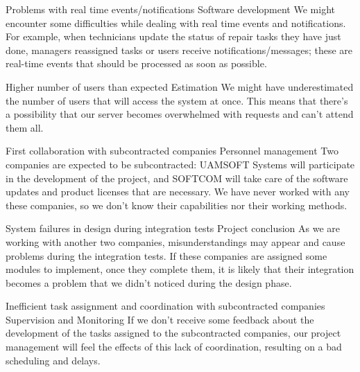\begin{risk}{Problems with real time events/notifications}
\label{riskRealTime}
\riskcat Software development
\riskdesc We might encounter some difficulties while dealing with real time events and notifications. For example, when technicians update the status of repair tasks they have just done, managers reassigned tasks or users receive notifications/messages; these are real-time events that should be processed as soon as possible.
\end{risk}

\begin{risk}{Higher number of users than expected}
\label{riskUserLoad}
\riskcat Estimation
\riskdesc We might have underestimated the number of users that will access the system at once. This means that there's a possibility that our server becomes overwhelmed with requests and can't attend them all.
\end{risk}

\begin{risk}{First collaboration with subcontracted companies}
\label{riskCollaboration}
\riskcat Personnel management
\riskdesc Two companies are expected to be subcontracted: UAMSOFT Systems will participate in the development of the project, and SOFTCOM will take care of the software updates and product licenses that are necessary. We have never worked with any these companies, so we don't know their capabilities nor their working methods.
\end{risk}

\begin{risk}{System failures in design during integration tests}
\label{riskIntegrationTests}
\riskcat Project conclusion
\riskdesc As we are working with another two companies, misunderstandings may appear and cause problems during the integration tests. If these companies are assigned some modules to implement, once they complete them, it is likely that their integration becomes a problem that we didn't noticed during the design phase.
\end{risk}

\begin{risk}{Inefficient task assignment and coordination with subcontracted companies}
\label{riskAssignment}
\riskcat Supervision and Monitoring
\riskdesc If we don't receive some feedback about the development of the tasks assigned to the subcontracted companies, our project management will feel the effects of this lack of coordination, resulting on a bad scheduling and delays.
\end{risk}

